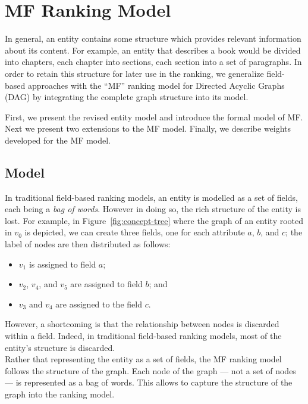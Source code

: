 \section{MF Ranking Model}
\label{chap:tree-ranking:mf-model}

In general, an entity contains some structure which provides relevant information about its content. For example, an entity that describes a book would be divided into chapters, each chapter into sections, each section into a set of paragraphs. In order to retain this structure for later use in the ranking, we generalize \gls{field}-based approaches with the ``MF'' ranking model for Directed Acyclic Graphs (DAG) by integrating the complete graph structure into its model.

First, we present the revised entity model and introduce the formal model of \gls{MF}. Next we present two extensions to the \gls{MF} model. Finally, we describe weights developed for the \gls{MF} model.

\subsection{Model}

In traditional field-based ranking models, an entity is modelled as a set of fields, each being a \emph{bag of words}. However in doing so, the rich structure of the entity is lost. For example, in Figure~\ref{fig:concept-tree} where the graph of an entity rooted in $v_0$ is depicted, we can create three fields, one for each attribute $a$, $b$, and $c$; the label of nodes are then distributed as follows:
\begin{itemize}
	\item $v_1$ is assigned to field $a$;
	\item $v_2$, $v_4$, and $v_5$ are assigned to field $b$; and
	\item $v_3$ and $v_4$ are assigned to the field $c$.
\end{itemize}
However, a shortcoming is that the relationship between nodes is discarded within a field. Indeed, in traditional field-based ranking models, most of the entity's structure is discarded.\\

Rather that representing the entity as a set of fields, the \gls{MF} ranking model follows the structure of the graph. Each node of the graph --- not a set of nodes --- is represented as a bag of words. This allows to capture the structure of the graph into the ranking model.

